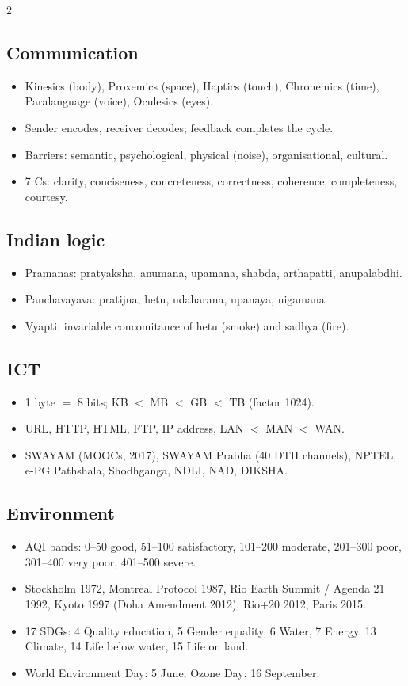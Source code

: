 \begin{multicols}{2}
\subsection*{Communication}
\begin{itemize}
\item Kinesics (body), Proxemics (space), Haptics (touch), Chronemics (time), Paralanguage (voice), Oculesics (eyes).
\item Sender encodes, receiver decodes; feedback completes the cycle.
\item Barriers: semantic, psychological, physical (noise), organisational, cultural.
\item 7 Cs: clarity, conciseness, concreteness, correctness, coherence, completeness, courtesy.
\end{itemize}
\subsection*{Indian logic}
\begin{itemize}
\item Pramanas: pratyaksha, anumana, upamana, shabda, arthapatti, anupalabdhi.
\item Panchavayava: pratijna, hetu, udaharana, upanaya, nigamana.
\item Vyapti: invariable concomitance of hetu (smoke) and sadhya (fire).
\end{itemize}
\columnbreak
\subsection*{ICT}
\begin{itemize}
\item 1 byte $=$ 8 bits; KB $<$ MB $<$ GB $<$ TB (factor 1024).
\item URL, HTTP, HTML, FTP, IP address, LAN $<$ MAN $<$ WAN.
\item SWAYAM (MOOCs, 2017), SWAYAM Prabha (40 DTH channels), NPTEL, e-PG Pathshala, Shodhganga, NDLI, NAD, DIKSHA.
\end{itemize}
\subsection*{Environment}
\begin{itemize}
\item AQI bands: 0--50 good, 51--100 satisfactory, 101--200 moderate, 201--300 poor, 301--400 very poor, 401--500 severe.
\item Stockholm 1972, Montreal Protocol 1987, Rio Earth Summit / Agenda 21 1992, Kyoto 1997 (Doha Amendment 2012), Rio+20 2012, Paris 2015.
\item 17 SDGs: 4 Quality education, 5 Gender equality, 6 Water, 7 Energy, 13 Climate, 14 Life below water, 15 Life on land.
\item World Environment Day: 5 June; Ozone Day: 16 September.
\end{itemize}

\end{multicols}

